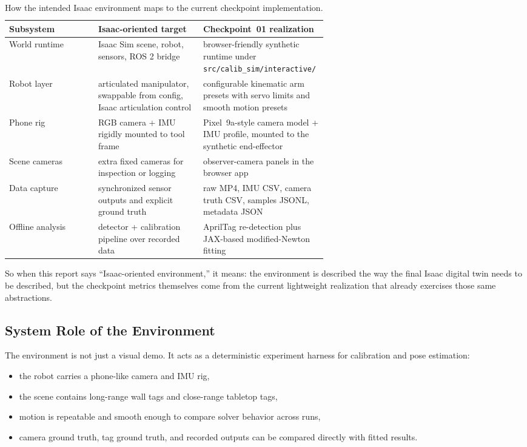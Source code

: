 \documentclass[11pt,a4paper]{article}
\begin{document}
\begin{table}[H]
\centering
\caption{How the intended Isaac environment maps to the current checkpoint implementation.}
\label{tab:isaac-map}
\begin{tabularx}{\linewidth}{>{\raggedright\arraybackslash}p{0.28\linewidth}>{\raggedright\arraybackslash}p{0.33\linewidth}X}
\toprule
Subsystem & Isaac-oriented target & Checkpoint~01 realization \\
\midrule
World runtime & Isaac Sim scene, robot, sensors, ROS 2 bridge & browser-friendly synthetic runtime under \texttt{src/calib\_sim/interactive/} \\
Robot layer & articulated manipulator, swappable from config, Isaac articulation control & configurable kinematic arm presets with servo limits and smooth motion presets \\
Phone rig & RGB camera + IMU rigidly mounted to tool frame & Pixel~9a-style camera model + IMU profile, mounted to the synthetic end-effector \\
Scene cameras & extra fixed cameras for inspection or logging & observer-camera panels in the browser app \\
Data capture & synchronized sensor outputs and explicit ground truth & raw MP4, IMU CSV, camera truth CSV, samples JSONL, metadata JSON \\
Offline analysis & detector + calibration pipeline over recorded data & AprilTag re-detection plus JAX-based modified-Newton fitting \\
\bottomrule
\end{tabularx}
\end{table}

So when this report says ``Isaac-oriented environment,'' it means: the environment is described the way the final Isaac digital twin needs to be described, but the checkpoint metrics themselves come from the current lightweight realization that already exercises those same abstractions.

\subsection{System Role of the Environment}

The environment is not just a visual demo.
It acts as a deterministic experiment harness for calibration and pose estimation:

\begin{itemize}
  \item the robot carries a phone-like camera and IMU rig,
  \item the scene contains long-range wall tags and close-range tabletop tags,
  \item motion is repeatable and smooth enough to compare solver behavior across runs,
  \item camera ground truth, tag ground truth, and recorded outputs can be compared directly with fitted results.
\end{itemize}
\end{document}
